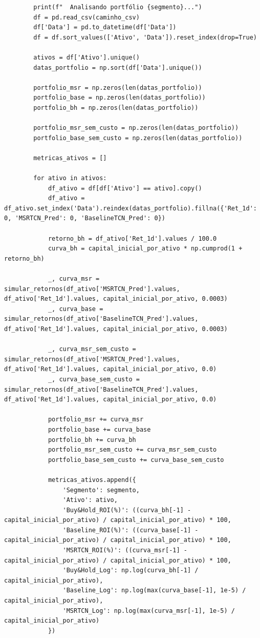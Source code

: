 \documentclass{article}
\begin{document}
\begin{verbatim}
        print(f"  Analisando portfólio {segmento}...")
        df = pd.read_csv(caminho_csv)
        df['Data'] = pd.to_datetime(df['Data'])
        df = df.sort_values(['Ativo', 'Data']).reset_index(drop=True)
        
        ativos = df['Ativo'].unique()
        datas_portfolio = np.sort(df['Data'].unique())
        
        portfolio_msr = np.zeros(len(datas_portfolio))
        portfolio_base = np.zeros(len(datas_portfolio))
        portfolio_bh = np.zeros(len(datas_portfolio))
        
        portfolio_msr_sem_custo = np.zeros(len(datas_portfolio))
        portfolio_base_sem_custo = np.zeros(len(datas_portfolio))
        
        metricas_ativos = []
        
        for ativo in ativos:
            df_ativo = df[df['Ativo'] == ativo].copy()
            df_ativo = df_ativo.set_index('Data').reindex(datas_portfolio).fillna({'Ret_1d': 0, 'MSRTCN_Pred': 0, 'BaselineTCN_Pred': 0})
            
            retorno_bh = df_ativo['Ret_1d'].values / 100.0
            curva_bh = capital_inicial_por_ativo * np.cumprod(1 + retorno_bh)
            
            _, curva_msr = simular_retornos(df_ativo['MSRTCN_Pred'].values, df_ativo['Ret_1d'].values, capital_inicial_por_ativo, 0.0003)
            _, curva_base = simular_retornos(df_ativo['BaselineTCN_Pred'].values, df_ativo['Ret_1d'].values, capital_inicial_por_ativo, 0.0003)
            
            _, curva_msr_sem_custo = simular_retornos(df_ativo['MSRTCN_Pred'].values, df_ativo['Ret_1d'].values, capital_inicial_por_ativo, 0.0)
            _, curva_base_sem_custo = simular_retornos(df_ativo['BaselineTCN_Pred'].values, df_ativo['Ret_1d'].values, capital_inicial_por_ativo, 0.0)
            
            portfolio_msr += curva_msr
            portfolio_base += curva_base
            portfolio_bh += curva_bh
            portfolio_msr_sem_custo += curva_msr_sem_custo
            portfolio_base_sem_custo += curva_base_sem_custo
            
            metricas_ativos.append({
                'Segmento': segmento,
                'Ativo': ativo,
                'Buy&Hold_ROI(%)': ((curva_bh[-1] - capital_inicial_por_ativo) / capital_inicial_por_ativo) * 100,
                'Baseline_ROI(%)': ((curva_base[-1] - capital_inicial_por_ativo) / capital_inicial_por_ativo) * 100,
                'MSRTCN_ROI(%)': ((curva_msr[-1] - capital_inicial_por_ativo) / capital_inicial_por_ativo) * 100,
                'Buy&Hold_Log': np.log(curva_bh[-1] / capital_inicial_por_ativo),
                'Baseline_Log': np.log(max(curva_base[-1], 1e-5) / capital_inicial_por_ativo),
                'MSRTCN_Log': np.log(max(curva_msr[-1], 1e-5) / capital_inicial_por_ativo)
            })
            

\end{verbatim}
\end{document}
